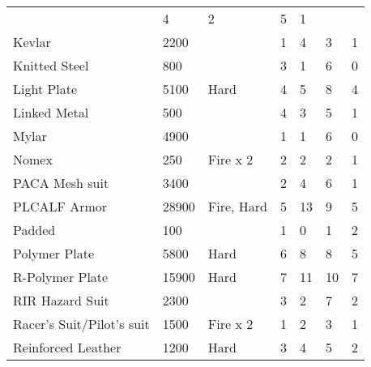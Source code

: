 \documentclass[twoside]{book}
\begin{document}
\begin{longtable}{p{1.25in}llp{2em}p{2em}p{2em}p{2em}}
  &
   4 
  &
   2 
  &
   5 
  &
   1 
  \tabularnewline
      
  \raggedright
           Kevlar 
  &
   2200 
  &
  
  &
   1 
  &
   4 
  &
   3 
  &
   1 
  \tabularnewline
      
  \raggedright
           Knitted Steel 
  &
   800 
  &
  
  &
   3 
  &
   1 
  &
   6 
  &
   0 
  \tabularnewline
      
  \raggedright
           Light Plate 
  &
   5100 
  &
   Hard 
  &
   4 
  &
   5 
  &
   8 
  &
   4 
  \tabularnewline
      
  \raggedright
           Linked Metal 
  &
   500 
  &
  
  &
   4 
  &
   3 
  &
   5 
  &
   1 
  \tabularnewline
      
  \raggedright
           Mylar 
  &
   4900 
  &
  
  &
   1 
  &
   1 
  &
   6 
  &
   0 
  \tabularnewline
      
  \raggedright
           Nomex 
  &
   250 
  &
   Fire x 2 
  &
   2 
  &
   2 
  &
   2 
  &
   1 
  \tabularnewline
      
  \raggedright
           PACA Mesh suit 
  &
   3400 
  &
  
  &
   2 
  &
   4 
  &
   6 
  &
   1 
  \tabularnewline
      
  \raggedright
           PLCALF Armor 
  &
   28900 
  &
   Fire, Hard 
  &
   5 
  &
   13 
  &
   9 
  &
   5 
  \tabularnewline
      
  \raggedright
           Padded 
  &
   100 
  &
  
  &
   1 
  &
   0 
  &
   1 
  &
   2 
  \tabularnewline
      
  \raggedright
           Polymer Plate 
  &
   5800 
  &
   Hard 
  &
   6 
  &
   8 
  &
   8 
  &
   5 
  \tabularnewline
      
  \raggedright
           R-Polymer Plate 
  &
   15900 
  &
   Hard 
  &
   7 
  &
   11 
  &
   10 
  &
   7 
  \tabularnewline
      
  \raggedright
           RIR Hazard Suit 
  &
   2300 
  &
  
  &
   3 
  &
   2 
  &
   7 
  &
   2 
  \tabularnewline
      
  \raggedright
           Racer's Suit/Pilot's
           suit 
  &
   1500 
  &
   Fire x 2 
  &
   1 
  &
   2 
  &
   3 
  &
   1 
  \tabularnewline
      
  \raggedright
           Reinforced Leather 
  &
   1200 
  &
   Hard 
  &
   3 
  &
   4 
  &
   5 
  &
   2 
  \tabularnewline
      

\end{longtable}
\end{document}
